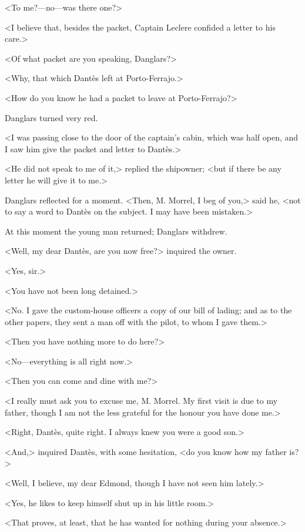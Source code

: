  <To me?—no—was there one?> 

 <I believe that, besides the packet, Captain Leclere confided a letter to his care.> 

 <Of what packet are you speaking, Danglars?> 

 <Why, that which Dantès left at Porto-Ferrajo.> 

 <How do you know he had a packet to leave at Porto-Ferrajo?> 

 Danglars turned very red. 

 <I was passing close to the door of the captain's cabin, which was half open, and I saw him give the packet and letter to Dantès.> 

 <He did not speak to me of it,> replied the shipowner; <but if there be any letter he will give it to me.> 

 Danglars reflected for a moment. <Then, M. Morrel, I beg of you,> said he, <not to say a word to Dantès on the subject. I may have been mistaken.> 

 At this moment the young man returned; Danglars withdrew. 

 <Well, my dear Dantès, are you now free?> inquired the owner. 

 <Yes, sir.> 

 <You have not been long detained.> 

 <No. I gave the custom-house officers a copy of our bill of lading; and as to the other papers, they sent a man off with the pilot, to whom I gave them.> 

 <Then you have nothing more to do here?> 

 <No—everything is all right now.> 

 <Then you can come and dine with me?> 

 <I really must ask you to excuse me, M. Morrel. My first visit is due to my father, though I am not the less grateful for the honour you have done me.>  
 
 <Right, Dantès, quite right. I always knew you were a good son.> 

 <And,> inquired Dantès, with some hesitation, <do you know how my father is?> 

 <Well, I believe, my dear Edmond, though I have not seen him lately.> 

 <Yes, he likes to keep himself shut up in his little room.> 

 <That proves, at least, that he has wanted for nothing during your absence.> 

